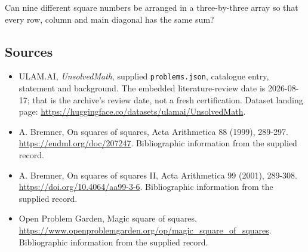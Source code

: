 \documentclass[11pt,a4paper]{article}
\begin{document}
Can nine different square numbers be arranged in a three-by-three array so that every row, column and main diagonal has the same sum?

\subsection{Sources}

{\small

\begin{itemize}

\item[\hypertarget{source:statement:1}{S1}] ULAM.AI, \emph{UnsolvedMath}, supplied \texttt{problems.json}, catalogue entry, statement and background. The embedded literature-review date is 2026-08-17; that is the archive’s review date, not a fresh certification. Dataset landing page: \url{https://huggingface.co/datasets/ulamai/UnsolvedMath}.

\item[\hypertarget{source:statement:2}{S2}] A. Bremner, On squares of squares, Acta Arithmetica 88 (1999), 289-297. \url{https://eudml.org/doc/207247}. Bibliographic information from the supplied record.

\item[\hypertarget{source:statement:3}{S3}] A. Bremner, On squares of squares II, Acta Arithmetica 99 (2001), 289-308. \url{https://doi.org/10.4064/aa99-3-6}. Bibliographic information from the supplied record.

\item[\hypertarget{source:statement:4}{S4}] Open Problem Garden, Magic square of squares. \url{https://www.openproblemgarden.org/op/magic_square_of_squares}. Bibliographic information from the supplied record.

\end{itemize}

}

\label{end:statement}
\end{document}
